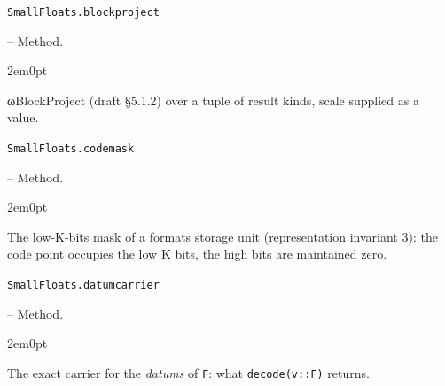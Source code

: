 \par\medskip\noindent\begin{minipage}{\linewidth}
\hypertarget{10671394415806872186}{\texttt{SmallFloats.blockproject}}  -- {Method.}
\nopagebreak
\begin{adjustwidth}{2em}{0pt}

ωBlockProject (draft §5.1.2) over a tuple of result kinds, scale supplied as a value.



\end{adjustwidth}
\end{minipage}
\par\medskip

\par\medskip\noindent\begin{minipage}{\linewidth}
\hypertarget{6493780492297571350}{\texttt{SmallFloats.codemask}}  -- {Method.}
\nopagebreak
\begin{adjustwidth}{2em}{0pt}

The low-K-bits mask of a format{\textquotesingle}s storage unit (representation invariant 3): the code point occupies the low K bits, the high bits are maintained zero.



\end{adjustwidth}
\end{minipage}
\par\medskip

\par\medskip\noindent\begin{minipage}{\linewidth}
\hypertarget{3840324864146613682}{\texttt{SmallFloats.datumcarrier}}  -- {Method.}
\nopagebreak
\begin{adjustwidth}{2em}{0pt}

The exact carrier for the \emph{datums} of \texttt{F}: what \texttt{decode(v::F)} returns.



\end{adjustwidth}
\end{minipage}
\par\medskip

